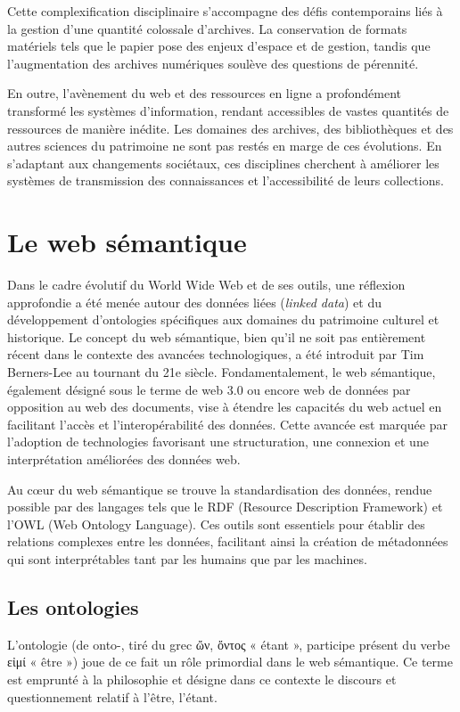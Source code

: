 \documentclass[12pt]{report}
\begin{document}
Cette complexification disciplinaire s'accompagne des défis contemporains liés à la gestion d'une quantité colossale d'archives. La conservation de formats matériels tels que le papier pose des enjeux d'espace et de gestion, tandis que l'augmentation des archives numériques soulève des questions de pérennité.

En outre, l'avènement du web et des ressources en ligne a profondément transformé les systèmes d'information, rendant accessibles de vastes quantités de ressources de manière inédite. Les domaines des archives, des bibliothèques et des autres sciences du patrimoine ne sont pas restés en marge de ces évolutions. En s'adaptant aux changements sociétaux, ces disciplines cherchent à améliorer les systèmes de transmission des connaissances et l'accessibilité de leurs collections.
\section{Le web sémantique}
Dans le cadre évolutif du World Wide Web et de ses outils, une réflexion approfondie a été menée autour des données liées (\textit{linked data}) et du développement d'ontologies spécifiques aux domaines du patrimoine culturel et historique. Le concept du web sémantique, bien qu'il ne soit pas entièrement récent dans le contexte des avancées technologiques, a été introduit par Tim Berners-Lee au tournant du 21e siècle. Fondamentalement, le web sémantique, également désigné sous le terme de web 3.0 ou encore web de données par opposition au web des documents, vise à étendre les capacités du web actuel en facilitant l'accès et l'interopérabilité des données. Cette avancée est marquée par l'adoption de technologies favorisant une structuration, une connexion et une interprétation améliorées des données web.

Au cœur du web sémantique se trouve la standardisation des données, rendue possible par des langages tels que le RDF (Resource Description Framework) et l'OWL (Web Ontology Language). Ces outils sont essentiels pour établir des relations complexes entre les données, facilitant ainsi la création de métadonnées qui sont interprétables tant par les humains que par les machines.

\subsection{Les ontologies}
L'ontologie (de onto-, tiré du grec \textgreek{ὤν, ὄντος} « étant », participe présent du verbe \textgreek{εἰμί} « être ») joue de ce fait un rôle primordial dans le web sémantique. Ce terme est emprunté à la philosophie et désigne dans ce contexte le discours et questionnement relatif à l'être, l'étant. 
\end{document}
